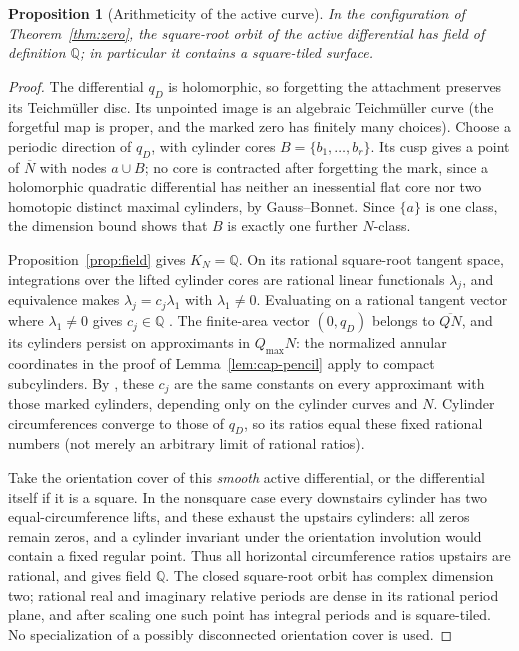 \documentclass[12pt]{article}
\newcommand{\cl}[1]{\overline{#1}}
\newtheorem{proposition}[theorem]{Proposition}
\theoremstyle{remark}
\begin{document}
\begin{proposition}[Arithmeticity of the active curve]\label{prop:active-field}
In the configuration of Theorem~\ref{thm:zero}, the square-root
orbit of the active differential has field of definition
\(\mathbb Q\); in particular it contains a square-tiled surface.
\end{proposition}
\begin{proof}
The differential \(q_D\) is holomorphic, so forgetting the
attachment preserves its Teichm\"uller disc. Its unpointed
image is an algebraic Teichm\"uller curve (the forgetful map is
proper, and the marked zero has finitely many choices).
Choose a periodic direction of \(q_D\), with cylinder cores
\(B=\{b_1,\ldots,b_r\}\). Its cusp gives a point of \(\cl N\)
with nodes \(a\cup B\); no core is contracted after forgetting the
mark, since a holomorphic quadratic differential has neither an
inessential flat core nor two homotopic distinct maximal cylinders,
by Gauss--Bonnet. Since \(\{a\}\) is one class, the dimension bound
shows that \(B\) is exactly one further \(N\)-class.

Proposition~\ref{prop:field} gives \(K_N=\mathbb Q\).
On its rational square-root tangent space, integrations over
the lifted cylinder cores are rational linear functionals
\(\lambda_j\), and equivalence makes
\(\lambda_j=c_j\lambda_1\) with \(\lambda_1\ne0\).
Evaluating on a rational tangent vector where \(\lambda_1\ne0\)
gives \(c_j\in\mathbb Q\) \cite[Lemma 7.2]{WrightCylinder}.
The finite-area vector \((0,q_D)\) belongs to \(\cl{QN}\), and its
cylinders persist on approximants in \(Q_{\max}N\): the normalized
annular coordinates in the proof of Lemma~\ref{lem:cap-pencil}
apply to compact subcylinders. By \cite[Corollary 2.2]{AHW}, these
\(c_j\) are the same constants on every approximant with those
marked cylinders, depending only on the cylinder curves and \(N\).
Cylinder circumferences converge to those of \(q_D\), so its
ratios equal these fixed rational numbers (not merely an arbitrary
limit of rational ratios).

Take the orientation cover of this \emph{smooth} active
differential, or the differential itself if it is a square.
In the nonsquare case every downstairs cylinder has two
equal-circumference lifts, and these exhaust the upstairs
cylinders: all zeros remain zeros, and a cylinder invariant under
the orientation involution would contain a fixed regular point.
Thus all horizontal circumference ratios upstairs are rational, and
\cite[Theorem 1.9]{WrightCylinder} gives field \(\mathbb Q\). The
closed square-root orbit has complex dimension two; rational real
and imaginary relative periods are dense in its rational period
plane, and after scaling one such point has integral periods and is
square-tiled. No specialization of a possibly disconnected
orientation cover is used.
\end{proof}
\end{document}
